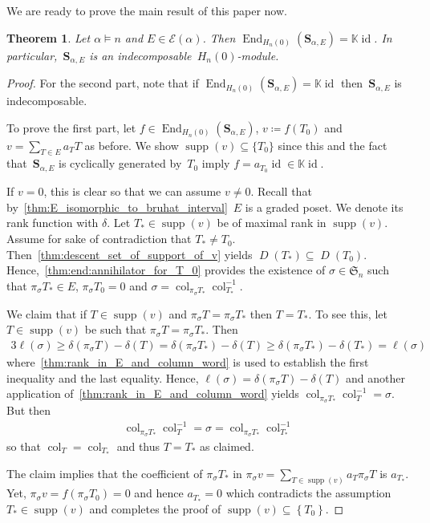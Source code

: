 \documentclass[10pt]{amsart}
\newtheorem{thm}{Theorem}[section]
\theoremstyle{plain}
\theoremstyle{plain}
\theoremstyle{plain}
\theoremstyle{plain}
\theoremstyle{plain}
\theoremstyle{definition}
\theoremstyle{definition}
\newcommand{\bs}[1]{\boldsymbol{#1} }
\newcommand{\mc}[1]{\mathcal{#1} }
\newcommand{\K}{\mathbb K}
\newcommand{\D}{\operatorname{\mathit{D}}}
\DeclareMathOperator{\id}{id}
\DeclareMathOperator{\supp}{supp}
\DeclareMathOperator{\End}{End}
\newcommand{\set}[1]{\left\{ #1 \right\}}
\newcommand{\fS}{\mathfrak{S}}
\newcommand{\col}{\operatorname{col}}
\newcommand{\He}{H_n(0)}
\newcommand{\se}{\bs S_{\alpha,E}}
\begin{document}
We are ready to prove the main result of this paper now.

\begin{thm}	\label{thm:end:end_is_c}
	Let $\alpha \vDash n$ and $E\in \mc E(\alpha)$. Then $\End_{\He}(\bs S_{\alpha,E})=\K \id$. In particular,~$\se$ is an indecomposable~$\He$-module.
\end{thm}

\begin{proof} 
	For the second part, note that if $\End_{\He}(\bs S_{\alpha,E})=\K \id$ then~$\se$ is indecomposable. 
		
	To prove the first part, let $f\in \End_{\He}(\se)$, $v\coloneqq f(T_0)$ and $v = \sum_{T\in E} a_T T$ as before.
	We show $\supp(v) \subseteq \{T_0\}$ since this and the fact that~$\se$ is cyclically generated by~$T_0$ imply $f = a_{T_0}\id\in \K \id$.
	
		
	If $v=0$, this is clear so that we can assume $v\neq 0$. Recall that by~\cref{thm:E_isomorphic_to_bruhat_interval}~$E$ is a graded poset. We denote its rank function with $\delta$.
	Let $T_*\in \supp(v)$ be of maximal rank in $\supp(v)$. Assume for sake of contradiction that $T_* \neq T_0$. Then~\cref{thm:descent_set_of_support_of_v} yields $\D(T_*) \subseteq \D(T_0)$. Hence,~\cref{thm:end:annihilator_for_T_0} provides the existence of $\sigma \in \fS_n$ such that $\pi_\sigma T_*\in E$, $\pi_\sigma T_0 = 0$ and $\sigma = \col_{\pi_\sigma T_*}\col_{T_*}^{-1}$.
	
	We claim that if $T\in \supp(v)$ and $\pi_\sigma T = \pi_\sigma T_*$ then $T = T_*$.
	To see this, let $T\in \supp(v)$ be such that $\pi_\sigma T = \pi_\sigma T_*$. Then
		\begin{alignat*}{3}
			\ell(\sigma) 
			\geq \delta(\pi_\sigma T) - \delta(T)
			= \delta(\pi_\sigma T_*) - \delta(T) 
			\geq \delta(\pi_\sigma T_*) - \delta(T_*) 
			= \ell(\sigma)
		\end{alignat*}
		where~\cref{thm:rank_in_E_and_column_word} is used to establish the first inequality and the last equality. Hence, 	$\ell(\sigma)= \delta(\pi_\sigma T) - \delta(T)$ and another application of~\cref{thm:rank_in_E_and_column_word} yields $\col_{\pi_\sigma T_*}\col^{-1}_{T} = \sigma$. But then
		\begin{align*}
		\col_{\pi_\sigma T_*}\col^{-1}_{T} = \sigma= \col_{\pi_\sigma T_*}\col_{T_*}^{-1}
		\end{align*}
		 so that $\col_T = \col_{T_*}$ and thus $T = T_*$ as claimed.
		
	The claim implies that the coefficient of $\pi_\sigma T_*$ in $\pi_\sigma v = \sum_{T \in \supp(v)} a_T \pi_\sigma T$ is $a_{T_*}$.	
	Yet, $\pi_\sigma v = f(\pi_\sigma T_0) = 0$ and hence $a_{T_*} = 0$ which contradicts the assumption $T_* \in \supp(v)$ and completes the proof of $\supp(v) \subseteq \set{T_0}$.
\end{proof}
\end{document}
